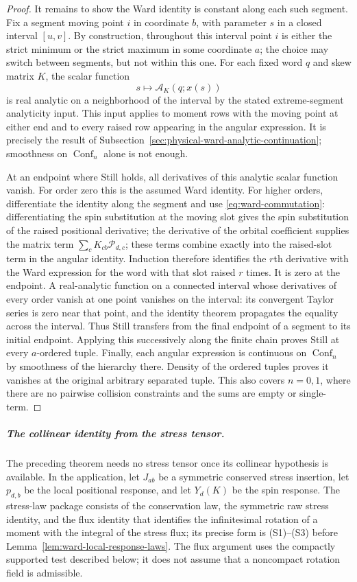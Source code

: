 \begin{proof}
It remains to show the Ward identity is constant along each such segment.
Fix a segment moving point $i$ in coordinate $b$, with parameter $s$ in a
closed interval $[u,v]$.  By construction, throughout this interval point
$i$ is either the strict minimum or the strict maximum in some coordinate
$a$; the choice may switch between segments, but not within this one.  For
each fixed word $q$ and skew matrix $K$, the scalar function
\[
 s\longmapsto \mathcal A_K(q;x(s))
\]
is real analytic on a neighborhood of the interval by the stated
extreme-segment analyticity input.  This input applies to moment rows with
the moving point at either end and to every raised row appearing in the
angular expression.  It is precisely the result of
Subsection~\ref{sec:physical-ward-analytic-continuation}; smoothness on
$\operatorname{Conf}_n$ alone is not enough.

At an endpoint where Still holds, all derivatives of this analytic scalar
function vanish.  For order zero this is the assumed Ward identity.  For
higher orders, differentiate the identity along the segment and use
\eqref{eq:ward-commutation}: differentiating the spin substitution at the
moving slot gives the spin substitution of the raised positional derivative;
the derivative of the orbital coefficient supplies the matrix term
$\sum_c K_{cb}\mathcal P_{d,c}$; these terms combine exactly into the
raised-slot term in the angular identity.  Induction therefore identifies
the $r$th derivative with the Ward expression for the word with that slot
raised $r$ times.  It is zero at the endpoint.  A real-analytic function on
a connected interval whose derivatives of every order vanish at one point
vanishes on the interval: its convergent Taylor series is zero near that
point, and the identity theorem propagates the equality across the interval.
Thus Still transfers from the final endpoint of a segment to its initial
endpoint.  Applying this successively along the finite chain proves Still
at every $a$-ordered tuple.  Finally, each angular expression is continuous
on $\operatorname{Conf}_n$ by smoothness of the hierarchy there.  Density of
the ordered tuples proves it vanishes at the original arbitrary separated
tuple.  This also covers $n=0,1$, where there are no pairwise collision
constraints and the sums are empty or single-term.
\end{proof}

\subparagraph{The collinear identity from the stress tensor.}
The preceding theorem needs no stress tensor once its collinear hypothesis
is available.  In the application, let $J_{ab}$ be a symmetric conserved
stress insertion, let $p_{d,b}$ be the local positional response, and let
$Y_d(K)$ be the spin response.  The stress-law package consists of the
conservation law, the symmetric raw stress identity, and the flux identity
that identifies the infinitesimal rotation of a moment with the integral
of the stress flux; its precise form is (S1)--(S3) before
Lemma~\ref{lem:ward-local-response-laws}. The flux argument uses the
compactly supported test described below; it does not assume that a
noncompact rotation field is admissible.

